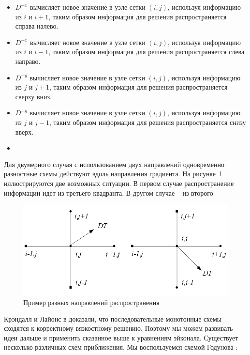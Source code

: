 \documentclass[a4paper,12pt]{article}
\begin{document}
\begin{itemize}
\item $D^{+x}$ вычисляет новое значение в узле сетки $(i,j)$, используя
  информацию из $i$ и $i+1$, таким образом информация для решения
  распространяется справа налево.

\item $D^{-x}$ вычисляет новое значение в узле сетки $(i,j)$, используя
  информацию из $i$ и $i-1$, таким образом информация для решения
  распространяется слева направо.
\item $D^{+y}$ вычисляет новое значение в узле сетки $(i,j)$, используя
  информацию из $j$ и $j+1$, таким образом информация для решения
  распространяется сверху вниз.

\item $D^{-y}$ вычисляет новое значение в узле сетки $(i,j)$, используя
  информацию из $j$ и $j-1$, таким образом информация для решения
  распространяется снизу вверх.

\item 
\end{itemize}


Для двумерного случая с использованием двух направлений одновременно
разностные схемы действуют вдоль направления градиента. На
рисунке~\ref{fig:upwind-schema} иллюстрируются две возможных
ситуации. В первом случае распространение информации идет из третьего
квадранта, В другом случае -- из второго
\begin{figure}[H]
  \centering
  \includegraphics[width=\linewidth]{upwind-schema.png}
  \hfil \caption{Пример разных направлений распространения}
  \label{fig:upwind-schema}

\end{figure}

Крэндалл и Лайонс в \cite{V1983} доказали, что последовательные
монотонные схемы сходятся к корректному вязкостному решению. Поэтому
мы можем развивать идеи дальше и применить сказанное выше к уравнениям
эйконала. Существует несколько различных схем приближения. Мы
воспользуемся схемой Годунова \cite{G1956,F2002}:
\end{document}
